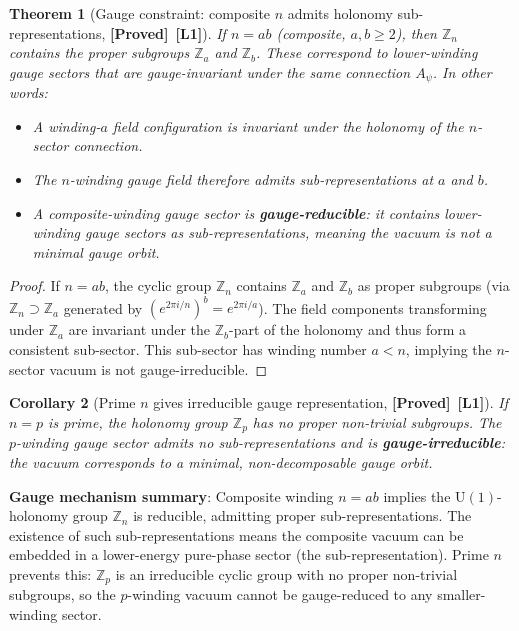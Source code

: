 \documentclass[12pt,a4paper]{article}
\newtheorem{theorem}{Theorem}[section]
\newtheorem{corollary}[theorem]{Corollary}
\theoremstyle{definition}
\theoremstyle{remark}
\newcommand{\ZZ}{\mathbb{Z}}
\newcommand{\PROVED}{\textbf{[Proved]}}
\newcommand{\Lone}{\textbf{[L1]}}
\begin{document}
\begin{theorem}[Gauge constraint: composite $n$ admits holonomy sub-representations,
\PROVED\ \Lone]
\label{thm:psp:gauge_rep}
If $n = ab$ (composite, $a,b \geq 2$), then $\ZZ_n$ contains the proper subgroups
$\ZZ_a$ and $\ZZ_b$.  These correspond to lower-winding gauge sectors that are
\emph{gauge-invariant under the same connection} $A_\psi$.  In other words:
\begin{itemize}
  \item A winding-$a$ field configuration is invariant under the holonomy of the
        $n$-sector connection.
  \item The $n$-winding gauge field therefore admits sub-representations at $a$ and $b$.
  \item A composite-winding gauge sector is \textbf{gauge-reducible}: it contains
        lower-winding gauge sectors as sub-representations, meaning the vacuum is
        not a minimal gauge orbit.
\end{itemize}
\end{theorem}

\begin{proof}
If $n = ab$, the cyclic group $\ZZ_n$ contains $\ZZ_a$ and $\ZZ_b$ as proper
subgroups (via $\ZZ_n \supset \ZZ_a$ generated by $(e^{2\pi i/n})^b = e^{2\pi i/a}$).
The field components transforming under $\ZZ_a$ are invariant under the
$\ZZ_b$-part of the holonomy and thus form a consistent sub-sector.
This sub-sector has winding number $a < n$, implying the $n$-sector vacuum is not
gauge-irreducible.
\end{proof}

\begin{corollary}[Prime $n$ gives irreducible gauge representation, \PROVED\ \Lone]
\label{cor:psp:gauge_prime}
If $n = p$ is prime, the holonomy group $\ZZ_p$ has no proper non-trivial subgroups.
The $p$-winding gauge sector admits no sub-representations and is
\textbf{gauge-irreducible}: the vacuum corresponds to a minimal, non-decomposable
gauge orbit.
\end{corollary}

\begin{resultbox}
\textbf{Gauge mechanism summary}: Composite winding $n = ab$ implies the
$\mathrm{U}(1)$-holonomy group $\ZZ_n$ is reducible, admitting proper sub-representations.
The existence of such sub-representations means the composite vacuum can be
embedded in a lower-energy pure-phase sector (the sub-representation).
Prime $n$ prevents this: $\ZZ_p$ is an irreducible cyclic group with no proper
non-trivial subgroups, so the $p$-winding vacuum cannot be gauge-reduced to any
smaller-winding sector.
\end{resultbox}
\end{document}
